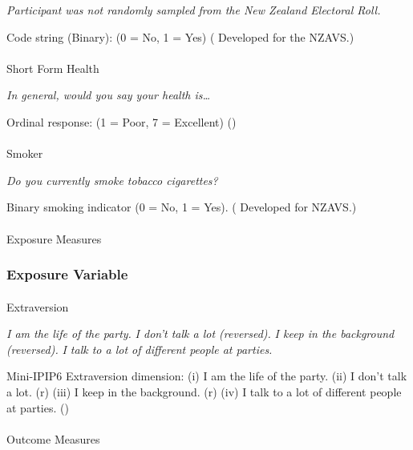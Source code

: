 \documentclass[
  single column]{article}
\makeatletter
\let\oldparagraph\paragraph
\renewcommand{\paragraph}{
    \@ifstar
      \xxxParagraphStar
      \xxxParagraphNoStar
  }
\newcommand{\xxxParagraphStar}[1]{\oldparagraph*{#1}\mbox{}}
\newcommand{\xxxParagraphNoStar}[1]{\oldparagraph{#1}\mbox{}}
\makeatother
\begin{document}
\emph{Participant was not randomly sampled from the New Zealand
Electoral Roll.}

Code string (Binary): (0 = No, 1 = Yes)
( Developed for the
NZAVS.)

\paragraph{Short Form Health}\label{short-form-health}

\emph{In general, would you say your health is\ldots{}}

Ordinal response: (1 = Poor, 7 = Excellent)
()

\paragraph{Smoker}\label{smoker}

\emph{Do you currently smoke tobacco cigarettes?}

Binary smoking indicator (0 = No, 1 = Yes).
( Developed for NZAVS.)

\paragraph{Exposure Measures}\label{exposure-measures}

\subsubsection{Exposure Variable}\label{exposure-variable}

\paragraph{Extraversion}\label{extraversion}

\emph{I am the life of the party.} \emph{I don't talk a lot (reversed).}
\emph{I keep in the background (reversed).} \emph{I talk to a lot of
different people at parties.}

Mini-IPIP6 Extraversion dimension: (i) I am the life of the party. (ii)
I don't talk a lot. (r) (iii) I keep in the background. (r) (iv) I talk
to a lot of different people at parties.
()

\paragraph{Outcome Measures}\label{outcome-measures}
\end{document}
